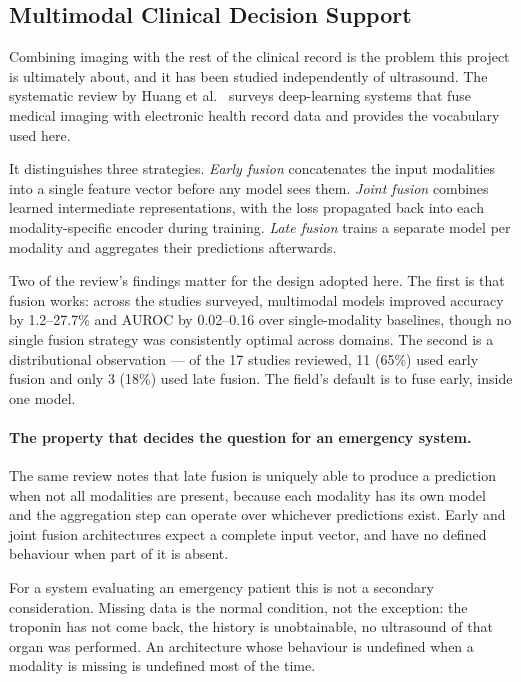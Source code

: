 \subsection{Multimodal Clinical Decision Support}
\label{subsec:sota-multimodal}

Combining imaging with the rest of the clinical record is the problem this project is
ultimately about, and it has been studied independently of ultrasound. The systematic
review by Huang et al.\ \cite{huang2020fusion} surveys deep-learning systems that fuse
medical imaging with electronic health record data and provides the vocabulary used here.

It distinguishes three strategies. \emph{Early fusion} concatenates the input modalities
into a single feature vector before any model sees them. \emph{Joint fusion} combines
learned intermediate representations, with the loss propagated back into each
modality-specific encoder during training. \emph{Late fusion} trains a separate model per
modality and aggregates their predictions afterwards.

Two of the review's findings matter for the design adopted here. The first is that fusion
works: across the studies surveyed, multimodal models improved accuracy by 1.2--27.7\% and
AUROC by 0.02--0.16 over single-modality baselines, though no single fusion strategy was
consistently optimal across domains. The second is a distributional observation --- of the
17 studies reviewed, 11 (65\%) used early fusion and only 3 (18\%) used late fusion. The
field's default is to fuse early, inside one model.

\paragraph{The property that decides the question for an emergency system.} The same review
notes that late fusion is uniquely able to produce a prediction when not all modalities are
present, because each modality has its own model and the aggregation step can operate over
whichever predictions exist. Early and joint fusion architectures expect a complete input
vector, and have no defined behaviour when part of it is absent.

For a system evaluating an emergency patient this is not a secondary consideration. Missing
data is the normal condition, not the exception: the troponin has not come back, the
history is unobtainable, no ultrasound of that organ was performed. An architecture whose
behaviour is undefined when a modality is missing is undefined most of the time.


